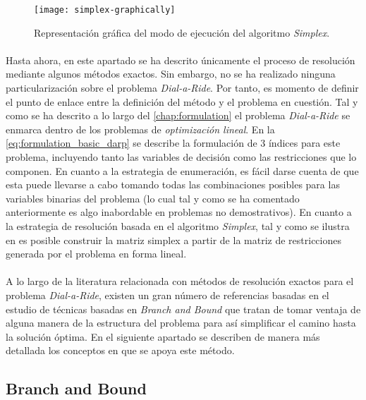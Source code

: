 \documentclass{subfiles}
\begin{document}
      \begin{figure}[ht]
        \centering
        \texttt{[image: simplex-graphically]}
        \caption{Representación gráfica del modo de ejecución del algoritmo \emph{Simplex}.}
        \label{img:solving_simplex}
      \end{figure}

      \paragraph{}
      Hasta ahora, en este apartado se ha descrito únicamente el proceso de resolución mediante algunos métodos exactos. Sin embargo, no se ha realizado ninguna particularización sobre el problema \emph{Dial-a-Ride}. Por tanto, es momento de definir el punto de enlace entre la definición del método y el problema en cuestión. Tal y como se ha descrito a lo largo del \cref{chap:formulation} el problema \emph{Dial-a-Ride} se enmarca dentro de los problemas de \emph{optimización lineal}. En la \cref{eq:formulation_basic_darp} se describe la formulación de $3$ índices para este problema, incluyendo tanto las variables de decisión como las restricciones que lo componen. En cuanto a la estrategia de enumeración, es fácil darse cuenta de que esta puede llevarse a cabo tomando todas las combinaciones posibles para las variables binarias del problema (lo cual tal y como se ha comentado anteriormente es algo inabordable en problemas no demostrativos). En cuanto a la estrategia de resolución basada en el algoritmo \emph{Simplex}, tal y como se ilustra en \cite{klee1970good} es posible construir la matriz simplex a partir de la matriz de restricciones generada por el problema en forma lineal.

      \paragraph{}
      A lo largo de la literatura relacionada con métodos de resolución exactos para el problema \emph{Dial-a-Ride}, existen un gran número de referencias basadas en el estudio de técnicas basadas en \emph{Branch and Bound} que tratan de tomar ventaja de alguna manera de la estructura del problema para así simplificar el camino hasta la solución óptima. En el siguiente apartado se describen de manera más detallada los conceptos en que se apoya este método.

      \subsection{Branch and Bound}
      \label{sec:solving_branch_bound}
\end{document}
